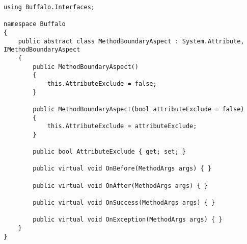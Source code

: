 \begin{lstlisting}[caption={../buffalo/MethodBoundaryAspect.cs}, label=../buffalo/MethodBoundaryAspect.cs, frame=tb, basicstyle=\scriptsize]﻿using Buffalo.Interfaces;

namespace Buffalo
{
    public abstract class MethodBoundaryAspect : System.Attribute, IMethodBoundaryAspect
    {
        public MethodBoundaryAspect()
        {
            this.AttributeExclude = false;
        }

        public MethodBoundaryAspect(bool attributeExclude = false)
        {
            this.AttributeExclude = attributeExclude;
        }

        public bool AttributeExclude { get; set; }

        public virtual void OnBefore(MethodArgs args) { }

        public virtual void OnAfter(MethodArgs args) { }

        public virtual void OnSuccess(MethodArgs args) { }

        public virtual void OnException(MethodArgs args) { }
    }
}
\end{lstlisting}

